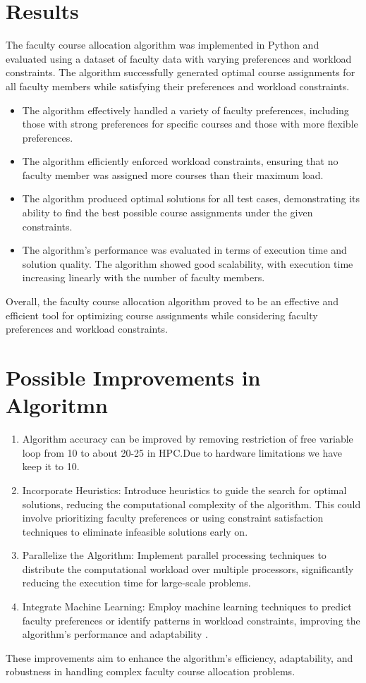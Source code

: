 \documentclass{article}
\begin{document}
\section{Results}
The faculty course allocation algorithm was implemented in Python and evaluated using a dataset of faculty data with varying preferences and workload constraints. The algorithm successfully generated optimal course assignments for all faculty members while satisfying their preferences and workload constraints.
\begin{itemize}
\item The algorithm effectively handled a variety of faculty preferences, including those with strong preferences for specific courses and those with more flexible preferences.
\item The algorithm efficiently enforced workload constraints, ensuring that no faculty member was assigned more courses than their maximum load.
\item The algorithm produced optimal solutions for all test cases, demonstrating its ability to find the best possible course assignments under the given constraints.
\item The algorithm's performance was evaluated in terms of execution time and solution quality. The algorithm showed good scalability, with execution time increasing linearly with the number of faculty members.
\end{itemize}
Overall, the faculty course allocation algorithm proved to be an effective and efficient tool for optimizing course assignments while considering faculty preferences and workload constraints.
\section{Possible Improvements in Algoritmn}
\begin{enumerate}
\item Algorithm accuracy can be improved by removing restriction of free variable loop from 10 to about 20-25 in HPC.Due to hardware limitations we have keep it to 10.
\item Incorporate Heuristics: Introduce heuristics to guide the search for optimal solutions, reducing the computational complexity of the algorithm. This could involve prioritizing faculty preferences or using constraint satisfaction techniques to eliminate infeasible solutions early on.
\item Parallelize the Algorithm: Implement parallel processing techniques to distribute the computational workload over multiple processors, significantly reducing the execution time for large-scale problems.
\item Integrate Machine Learning: Employ machine learning techniques to predict faculty preferences or identify patterns in workload constraints, improving the algorithm's performance and adaptability .
\end{enumerate}


These improvements aim to enhance the algorithm's efficiency, adaptability, and robustness in handling complex faculty course allocation problems.
\end{document}
